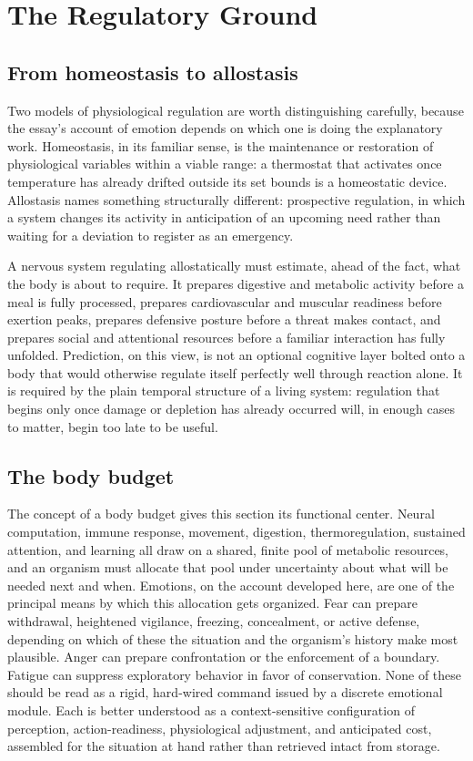 \documentclass[11pt]{article}
\begin{document}
\section{The Regulatory Ground}\label{sec:regulatory}

\subsection{From homeostasis to allostasis}

Two models of physiological regulation are worth distinguishing carefully, because the essay's account of emotion depends on which one is doing the explanatory work. Homeostasis, in its familiar sense, is the maintenance or restoration of physiological variables within a viable range: a thermostat that activates once temperature has already drifted outside its set bounds is a homeostatic device. Allostasis names something structurally different: prospective regulation, in which a system changes its activity in anticipation of an upcoming need rather than waiting for a deviation to register as an emergency.

A nervous system regulating allostatically must estimate, ahead of the fact, what the body is about to require. It prepares digestive and metabolic activity before a meal is fully processed, prepares cardiovascular and muscular readiness before exertion peaks, prepares defensive posture before a threat makes contact, and prepares social and attentional resources before a familiar interaction has fully unfolded. Prediction, on this view, is not an optional cognitive layer bolted onto a body that would otherwise regulate itself perfectly well through reaction alone. It is required by the plain temporal structure of a living system: regulation that begins only once damage or depletion has already occurred will, in enough cases to matter, begin too late to be useful.

\subsection{The body budget}

The concept of a body budget gives this section its functional center. Neural computation, immune response, movement, digestion, thermoregulation, sustained attention, and learning all draw on a shared, finite pool of metabolic resources, and an organism must allocate that pool under uncertainty about what will be needed next and when. Emotions, on the account developed here, are one of the principal means by which this allocation gets organized. Fear can prepare withdrawal, heightened vigilance, freezing, concealment, or active defense, depending on which of these the situation and the organism's history make most plausible. Anger can prepare confrontation or the enforcement of a boundary. Fatigue can suppress exploratory behavior in favor of conservation. None of these should be read as a rigid, hard-wired command issued by a discrete emotional module. Each is better understood as a context-sensitive configuration of perception, action-readiness, physiological adjustment, and anticipated cost, assembled for the situation at hand rather than retrieved intact from storage.
\end{document}
